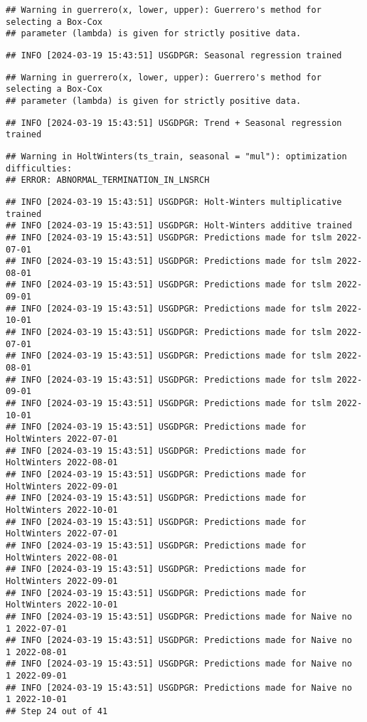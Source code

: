 \documentclass[
]{article}
\begin{document}
\begin{verbatim}
## Warning in guerrero(x, lower, upper): Guerrero's method for selecting a Box-Cox
## parameter (lambda) is given for strictly positive data.
\end{verbatim}

\begin{verbatim}
## INFO [2024-03-19 15:43:51] USGDPGR: Seasonal regression trained
\end{verbatim}

\begin{verbatim}
## Warning in guerrero(x, lower, upper): Guerrero's method for selecting a Box-Cox
## parameter (lambda) is given for strictly positive data.
\end{verbatim}

\begin{verbatim}
## INFO [2024-03-19 15:43:51] USGDPGR: Trend + Seasonal regression trained
\end{verbatim}

\begin{verbatim}
## Warning in HoltWinters(ts_train, seasonal = "mul"): optimization difficulties:
## ERROR: ABNORMAL_TERMINATION_IN_LNSRCH
\end{verbatim}

\begin{verbatim}
## INFO [2024-03-19 15:43:51] USGDPGR: Holt-Winters multiplicative trained
## INFO [2024-03-19 15:43:51] USGDPGR: Holt-Winters additive trained
## INFO [2024-03-19 15:43:51] USGDPGR: Predictions made for tslm 2022-07-01
## INFO [2024-03-19 15:43:51] USGDPGR: Predictions made for tslm 2022-08-01
## INFO [2024-03-19 15:43:51] USGDPGR: Predictions made for tslm 2022-09-01
## INFO [2024-03-19 15:43:51] USGDPGR: Predictions made for tslm 2022-10-01
## INFO [2024-03-19 15:43:51] USGDPGR: Predictions made for tslm 2022-07-01
## INFO [2024-03-19 15:43:51] USGDPGR: Predictions made for tslm 2022-08-01
## INFO [2024-03-19 15:43:51] USGDPGR: Predictions made for tslm 2022-09-01
## INFO [2024-03-19 15:43:51] USGDPGR: Predictions made for tslm 2022-10-01
## INFO [2024-03-19 15:43:51] USGDPGR: Predictions made for HoltWinters 2022-07-01
## INFO [2024-03-19 15:43:51] USGDPGR: Predictions made for HoltWinters 2022-08-01
## INFO [2024-03-19 15:43:51] USGDPGR: Predictions made for HoltWinters 2022-09-01
## INFO [2024-03-19 15:43:51] USGDPGR: Predictions made for HoltWinters 2022-10-01
## INFO [2024-03-19 15:43:51] USGDPGR: Predictions made for HoltWinters 2022-07-01
## INFO [2024-03-19 15:43:51] USGDPGR: Predictions made for HoltWinters 2022-08-01
## INFO [2024-03-19 15:43:51] USGDPGR: Predictions made for HoltWinters 2022-09-01
## INFO [2024-03-19 15:43:51] USGDPGR: Predictions made for HoltWinters 2022-10-01
## INFO [2024-03-19 15:43:51] USGDPGR: Predictions made for Naive no  1 2022-07-01
## INFO [2024-03-19 15:43:51] USGDPGR: Predictions made for Naive no  1 2022-08-01
## INFO [2024-03-19 15:43:51] USGDPGR: Predictions made for Naive no  1 2022-09-01
## INFO [2024-03-19 15:43:51] USGDPGR: Predictions made for Naive no  1 2022-10-01
## Step 24 out of 41
\end{verbatim}
\end{document}
